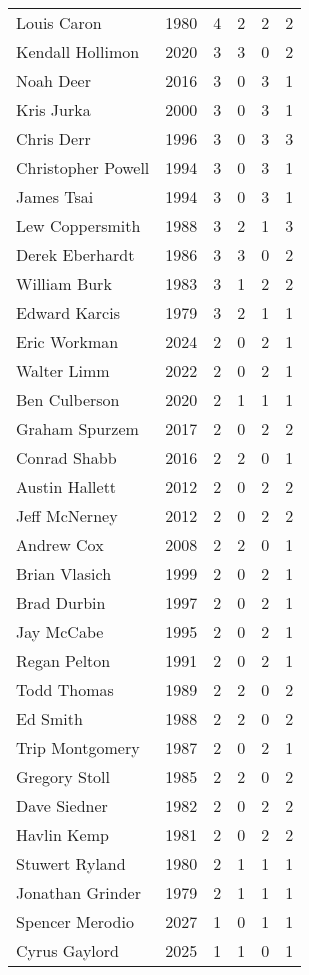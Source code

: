 \begin{longtable}{lccccc}
Louis Caron & 1980 & 4 & 2 & 2 & 2 \\
Kendall Hollimon & 2020 & 3 & 3 & 0 & 2 \\
Noah Deer & 2016 & 3 & 0 & 3 & 1 \\
Kris Jurka & 2000 & 3 & 0 & 3 & 1 \\
Chris Derr & 1996 & 3 & 0 & 3 & 3 \\
Christopher Powell & 1994 & 3 & 0 & 3 & 1 \\
James Tsai & 1994 & 3 & 0 & 3 & 1 \\
Lew Coppersmith & 1988 & 3 & 2 & 1 & 3 \\
Derek Eberhardt & 1986 & 3 & 3 & 0 & 2 \\
William Burk & 1983 & 3 & 1 & 2 & 2 \\
Edward Karcis & 1979 & 3 & 2 & 1 & 1 \\
Eric Workman & 2024 & 2 & 0 & 2 & 1 \\
Walter Limm & 2022 & 2 & 0 & 2 & 1 \\
Ben Culberson & 2020 & 2 & 1 & 1 & 1 \\
Graham Spurzem & 2017 & 2 & 0 & 2 & 2 \\
Conrad Shabb & 2016 & 2 & 2 & 0 & 1 \\
Austin Hallett & 2012 & 2 & 0 & 2 & 2 \\
Jeff McNerney & 2012 & 2 & 0 & 2 & 2 \\
Andrew Cox & 2008 & 2 & 2 & 0 & 1 \\
Brian Vlasich & 1999 & 2 & 0 & 2 & 1 \\
Brad Durbin & 1997 & 2 & 0 & 2 & 1 \\
Jay McCabe & 1995 & 2 & 0 & 2 & 1 \\
Regan Pelton & 1991 & 2 & 0 & 2 & 1 \\
Todd Thomas & 1989 & 2 & 2 & 0 & 2 \\
Ed Smith & 1988 & 2 & 2 & 0 & 2 \\
Trip Montgomery & 1987 & 2 & 0 & 2 & 1 \\
Gregory Stoll & 1985 & 2 & 2 & 0 & 2 \\
Dave Siedner & 1982 & 2 & 0 & 2 & 2 \\
Havlin Kemp & 1981 & 2 & 0 & 2 & 2 \\
Stuwert Ryland & 1980 & 2 & 1 & 1 & 1 \\
Jonathan Grinder & 1979 & 2 & 1 & 1 & 1 \\
Spencer Merodio & 2027 & 1 & 0 & 1 & 1 \\
Cyrus Gaylord & 2025 & 1 & 1 & 0 & 1 \\

\end{longtable}

